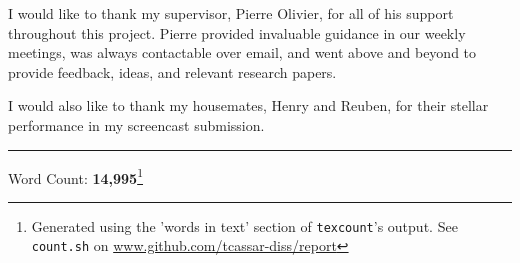I would like to thank my supervisor, Pierre Olivier, for all of his support
throughout this project. Pierre provided invaluable guidance in our weekly
meetings, was always contactable over email, and went above and beyond to
provide feedback, ideas, and relevant research papers. 

I would also like to thank my housemates, Henry and Reuben, for their stellar
performance in my screencast submission.

\clearpage

\tableofcontents


\vspace{2em} %
\noindent\hrule
\vspace{0.5em}
\noindent %
Word Count: \textbf{14,995}\footnote{Generated using the 'words
    in text' section of \texttt{texcount}'s output. See \texttt{count.sh} on
\href{https://github.com/tcassar-diss/report/blob/22fb0f59cd3ad3901718e77f0a7f9bfc86ec3180/count.sh}{www.github.com/tcassar-diss/report}}
\par %

\clearpage

\printacronyms[name=Acronyms and Abbreviations]

\clearpage

\listoffigures

\clearpage

\listoftables

\clearpage

\listoflistings
